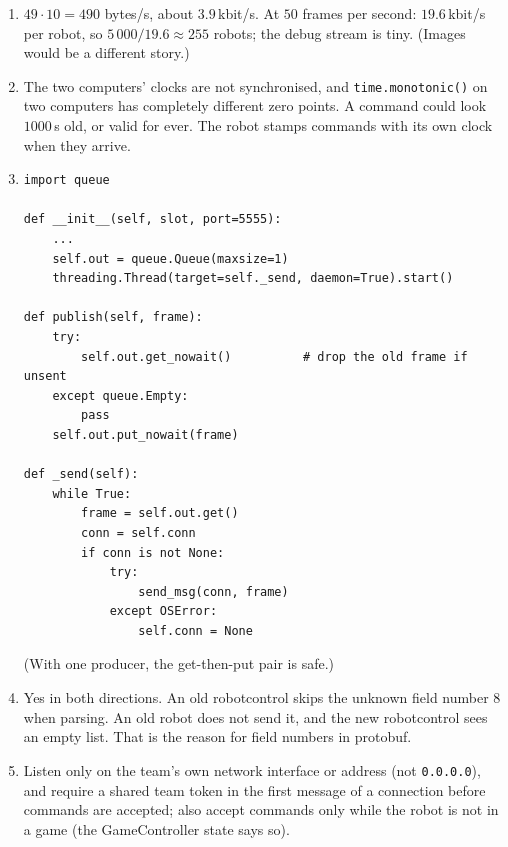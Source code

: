 \begin{enumerate}[label=\textbf{\ansnum.\arabic*}]
  \item $49\cdot10=490$ bytes/s, about $3.9$\,kbit/s. At $50$ frames per second: $19.6$\,kbit/s per robot, so $5\,000/19.6\approx255$ robots; the debug stream is tiny. (Images would be a different story.)
  \item The two computers' clocks are not synchronised, and \verb!time.monotonic()! on two computers has completely different zero points. A command could look $1000$\,s old, or valid for ever. The robot stamps commands with its own clock when they arrive.
  \item
\begin{verbatim}
import queue

def __init__(self, slot, port=5555):
    ...
    self.out = queue.Queue(maxsize=1)
    threading.Thread(target=self._send, daemon=True).start()

def publish(self, frame):
    try:
        self.out.get_nowait()          # drop the old frame if unsent
    except queue.Empty:
        pass
    self.out.put_nowait(frame)

def _send(self):
    while True:
        frame = self.out.get()
        conn = self.conn
        if conn is not None:
            try:
                send_msg(conn, frame)
            except OSError:
                self.conn = None
\end{verbatim}
(With one producer, the get-then-put pair is safe.)
  \item Yes in both directions. An old robotcontrol skips the unknown field number $8$ when parsing. An old robot does not send it, and the new robotcontrol sees an empty list. That is the reason for field numbers in protobuf.
  \item Listen only on the team's own network interface or address (not \texttt{0.0.0.0}), and require a shared team token in the first message of a connection before commands are accepted; also accept commands only while the robot is not in a game (the GameController state says so).
\end{enumerate}
